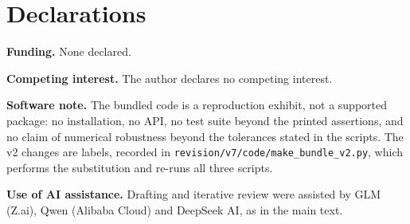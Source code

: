 \documentclass[11pt]{article}
\begin{document}
\vspace{0.8em}

\section*{Declarations}\label{declarations}

\textbf{Funding.} None declared.

\textbf{Competing interest.} The author declares no competing interest.

\textbf{Software note.} The bundled code is a reproduction exhibit, not a supported package: no installation, no API, no test suite beyond the printed assertions, and no claim of numerical robustness beyond the tolerances stated in the scripts. The v2 changes are labels, recorded in \texttt{revision/v7/code/make\_bundle\_v2.py}, which performs the substitution and re-runs all three scripts.

\textbf{Use of AI assistance.} Drafting and iterative review were assisted by GLM (Z.ai), Qwen (Alibaba Cloud) and DeepSeek AI, as in the main text.
\end{document}
